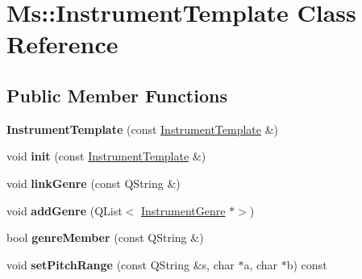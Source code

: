 \hypertarget{class_ms_1_1_instrument_template}{}\section{Ms\+:\+:Instrument\+Template Class Reference}
\label{class_ms_1_1_instrument_template}
\subsection*{Public Member Functions}
\begin{DoxyCompactItemize}
\item 
\mbox{\label{class_ms_1_1_instrument_template_a8b87566238960379f78b12cbcfc33b08}} 
{\bfseries Instrument\+Template} (const \hyperlink{class_ms_1_1_instrument_template}{Instrument\+Template} \&)
\item 
\mbox{\label{class_ms_1_1_instrument_template_a38d2abeecb1886a5d1cc9a22d1a2cb56}} 
void {\bfseries init} (const \hyperlink{class_ms_1_1_instrument_template}{Instrument\+Template} \&)
\item 
\mbox{\label{class_ms_1_1_instrument_template_a6eb032e01a82ee43b84d7dc3e4611d4a}} 
void {\bfseries link\+Genre} (const Q\+String \&)
\item 
\mbox{\label{class_ms_1_1_instrument_template_a23694e67d364e93d386c5d20d9433b38}} 
void {\bfseries add\+Genre} (Q\+List$<$ \hyperlink{class_ms_1_1_instrument_genre}{Instrument\+Genre} $\ast$$>$)
\item 
\mbox{\label{class_ms_1_1_instrument_template_a0b07d0fa8b3ce0ed2e944249d83fd694}} 
bool {\bfseries genre\+Member} (const Q\+String \&)
\item 
\mbox{\label{class_ms_1_1_instrument_template_a6576af20630b12322b57a455acd9ff10}} 
void {\bfseries set\+Pitch\+Range} (const Q\+String \&s, char $\ast$a, char $\ast$b) const
\item 
\mbox{\label{class_ms_1_1_instrument_template_ab16e3f2f20d5656c5d58ca99256be5e5}} 
$$
\end{DoxyCompactItemize}
